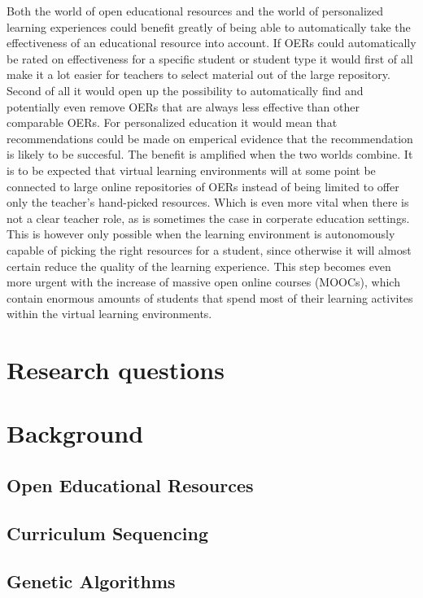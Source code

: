 Both the world of open educational resources and the world of personalized learning experiences could benefit greatly of being able to automatically take the effectiveness of an educational resource into account. If OERs could automatically be rated on effectiveness for a specific student or student type it would first of all make it a lot easier for teachers to select material out of the large repository. Second of all it would open up the possibility to automatically find and potentially even remove OERs that are always less effective than other comparable OERs. For personalized education it would mean that recommendations could be made on emperical evidence that the recommendation is likely to be succesful. The benefit is amplified when the two worlds combine. It is to be expected that virtual learning environments will at some point be connected to large online repositories of OERs instead of being limited to offer only the teacher’s hand-picked resources. Which is even more vital when there is not a clear teacher role, as is sometimes the case in corperate education settings. This is however only possible when the learning environment is autonomously capable of picking the right resources for a student, since otherwise it will almost certain reduce the quality of the learning experience. This step becomes even more urgent with the increase of massive open online courses (MOOCs), which contain enormous amounts of students that spend most of their learning activites within the virtual learning environments.
\section{Research questions}
\section{Background}
\subsection{Open Educational Resources}
\subsection{Curriculum Sequencing}
\subsection{Genetic Algorithms}
